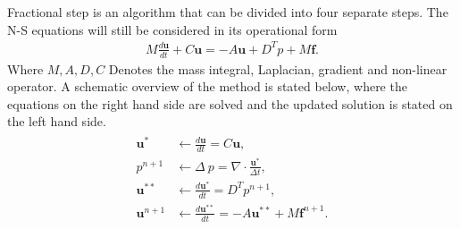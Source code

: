 Fractional step is an algorithm that can be divided into four separate steps. The N-S equations will still 
be considered in its operational form 
\begin{align}
    M\frac{d \mathbf{u}}{dt} + C\mathbf{u} = -A\mathbf{u} +D^T p +M\mathbf{f}.
    \label{eq:NSfracstep}
\end{align}
%
Where $M, A,D,C$ Denotes the mass integral, Laplacian, gradient and non-linear operator. 
A schematic overview of the method is stated below, where the equations on the right hand side are 
solved and the updated solution is stated on the left hand side.
\begin{align}
    \begin{split}
        \mathbf{u}^* &\leftarrow \frac{d\mathbf{u}}{dt}=C\mathbf{u},\\
    p^{n+1} &\leftarrow \Delta\: p = \nabla \cdot \frac{\mathbf{u}^*}{\Delta t},\\
    \mathbf{u}^{**} &\leftarrow  \frac{d\mathbf{u}^*}{dt} =D^Tp^{n+1},\\
    \mathbf{u}^{n+1} &\leftarrow \frac{d\mathbf{u}^{**}}{dt}= -A\mathbf{u}^{**}+M\mathbf{f}^{n+1}.
    \end{split}
    \label{eq:fracstep}
\end{align}

